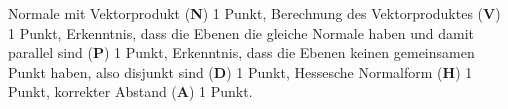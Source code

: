 \begin{bewertung}
Normale mit Vektorprodukt ({\bf N}) 1 Punkt,
Berechnung des Vektorproduktes ({\bf V}) 1 Punkt,
Erkenntnis, dass die Ebenen die gleiche Normale haben und damit
parallel sind ({\bf P}) 1 Punkt,
Erkenntnis, dass die Ebenen keinen gemeinsamen Punkt haben,
also disjunkt sind ({\bf D}) 1 Punkt,
Hessesche Normalform ({\bf H}) 1 Punkt,
korrekter Abstand ({\bf A}) 1 Punkt.
\end{bewertung}


